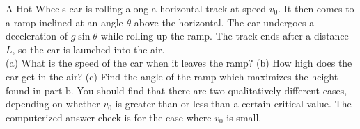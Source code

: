 A Hot Wheels car is rolling along a horizontal track at speed $v_0$.
It then comes to a ramp inclined at an angle $\theta$ above the horizontal.
The car undergoes a
deceleration of $g \sin \theta$ while rolling up the ramp. The track ends
after a distance $L$, so the car is launched into the air.\\
%
(a) What is the speed of the car when it leaves the ramp?\answercheck\hwendpart
%
(b) How high does the car get in the air?\answercheck\hwendpart
%
(c) Find the angle of the ramp which maximizes the height found in part b.
You should find that there are two qualitatively different cases, depending on whether
$v_0$ is greater than or less than a certain critical value. The computerized answer check
is for the case where $v_0$ is small.\answercheck
